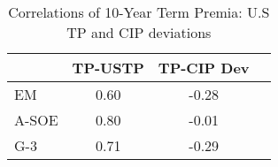 \begin{tiny}\begin{table}
		\centering
		\begin{tabular}{l|ccc}
			\toprule
			 & TP-USTP & TP-CIP Dev
			\\\midrule 
			EM & 0.60 & -0.28 \\
			A-SOE & 0.80 & -0.01 \\
			G-3 & 0.71 & -0.29 \\
			\bottomrule
		\end{tabular}
		\caption{Correlations of 10-Year Term Premia: U.S TP and CIP deviations}\label{tab:temp_tp_corr10yr}\end{table}\end{tiny}